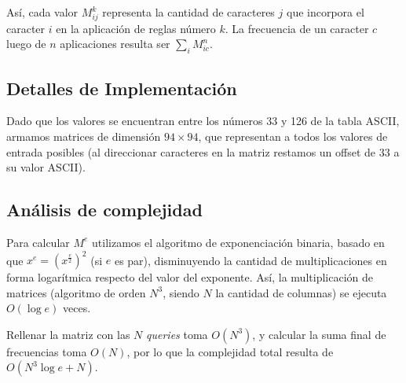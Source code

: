 Así, cada valor $M_{ij}^k$ representa la cantidad de caracteres $j$ que incorpora
el caracter $i$ en la aplicación de reglas número $k$. La frecuencia
de un caracter $c$ luego de $n$ aplicaciones resulta ser $\sum_i M_{ic}^n$.


\subsection*{Detalles de Implementación}

Dado que los valores se encuentran entre los números 33 y 126 de la tabla ASCII,
armamos matrices de dimensión $94\times 94$, que representan a todos los valores
de entrada posibles (al direccionar caracteres en la matriz restamos un offset
de 33 a su valor ASCII).


\subsection*{Análisis de complejidad}

Para calcular $M^e$ utilizamos el algoritmo de exponenciación binaria, basado en
que $x^e = (x^\frac e 2)^2$ (si $e$ es par), disminuyendo la cantidad de
multiplicaciones en forma logarítmica respecto del valor del exponente. Así, la
multiplicación de matrices (algoritmo de orden $N^3$, siendo $N$
la cantidad de columnas) se ejecuta $O(\log e)$ veces.

Rellenar la matriz con las $N$ {\sl queries} toma $O(N^3)$, y calcular la suma
final de frecuencias toma $O(N)$, por lo que la complejidad total resulta de
$O(N^3\log e + N)$.
